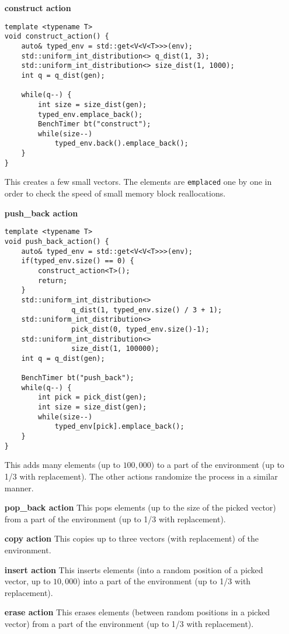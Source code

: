 \documentclass[inz, english, shortabstract]{iithesis}
\begin{document}
\begin{enumerate}[leftmargin=*,widest={\bf construct action}]
\item[\textbf{construct action}]
\begin{lstlisting}[caption=construct action]
template <typename T>
void construct_action() {
	auto& typed_env = std::get<V<V<T>>>(env);
	std::uniform_int_distribution<> q_dist(1, 3);
	std::uniform_int_distribution<> size_dist(1, 1000);
	int q = q_dist(gen);
	
	while(q--) {
		int size = size_dist(gen);
		typed_env.emplace_back();
		BenchTimer bt("construct");
		while(size--)
			typed_env.back().emplace_back();
	}
}
\end{lstlisting}
This creates a few small vectors. The elements are {\tt emplaced} one by one in order to check the speed of small memory block reallocations. 

\item[\bf push\_back action]
\begin{lstlisting}[caption=push\_back action]
template <typename T>
void push_back_action() {
	auto& typed_env = std::get<V<V<T>>>(env);
	if(typed_env.size() == 0) {
		construct_action<T>();
		return;
	}
	std::uniform_int_distribution<> 
				q_dist(1, typed_env.size() / 3 + 1);
	std::uniform_int_distribution<> 
				pick_dist(0, typed_env.size()-1);
	std::uniform_int_distribution<> 
				size_dist(1, 100000);
	int q = q_dist(gen);
	
	BenchTimer bt("push_back");
	while(q--) {
		int pick = pick_dist(gen);
		int size = size_dist(gen);
		while(size--)
			typed_env[pick].emplace_back();
	}
}
\end{lstlisting}
This adds many elements (up to $100,000$) to a part of the environment (up to 1/3 with replacement).
The other actions randomize the process in a similar manner.

\item[\bf pop\_back action]
This pops elements (up to the size of the picked vector) from a part of the environment (up to 1/3 with replacement). 

\item[\bf copy action]
This copies up to three vectors (with replacement) of the environment.

\item[\bf insert action]
This inserts elements (into a random position of a picked vector, up to $10,000$) into a part of the environment (up to 1/3 with replacement).

\item[\bf erase action]
This erases elements (between random positions in a picked vector) from a part of the environment (up to 1/3 with replacement).
\end{enumerate}
\end{document}
